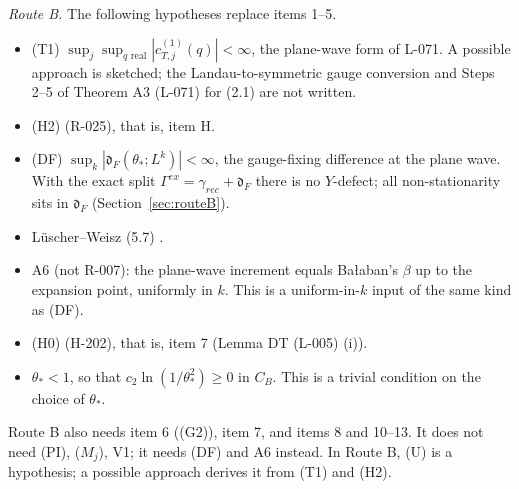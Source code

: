 \emph{Route B.} The following hypotheses replace items 1--5.
\begin{itemize}
\item[B1.] (T1) $\sup_j\sup_{q\text{ real}}|c^{(1)}_{T,j}(q)|<\infty$, the plane-wave form of L-071. A possible approach is sketched; the Landau-to-symmetric gauge conversion and Steps 2--5 of Theorem A3 (L-071) for (2.1) are not written.
\item[BH.] (H2) (R-025), that is, item H.
\item[B3.] (DF) $\sup_k|\mathfrak d_F(\theta_*;L^k)|<\infty$, the gauge-fixing difference at the plane wave. With the exact split $\Gamma^{ex}=\gamma_{rec}+\mathfrak d_F$ there is no $Y$-defect; all non-stationarity sits in $\mathfrak d_F$ (Section~\ref{sec:routeB}).
\item[B4.] L\"uscher--Weisz (5.7) \cite{luscherweisz1995}.
\item[B5.] A6 (not R-007): the plane-wave increment equals Ba{\l}aban's $\beta$ up to the expansion point, uniformly in $k$. This is a uniform-in-$k$ input of the same kind as (DF).
\item[B6.] (H0) (H-202), that is, item 7 (Lemma DT (L-005) (i)).
\item[B7.] $\theta_*<1$, so that $c_2\ln(1/\theta_*^2)\ge0$ in $C_B$. This is a trivial condition on the choice of $\theta_*$.
\end{itemize}
Route B also needs item 6 ((G2)), item 7, and items 8 and 10--13. It does not need (PI), ($M_j$), V1; it needs (DF) and A6 instead. In Route B, (U) is a hypothesis; a possible approach derives it from (T1) and (H2).


